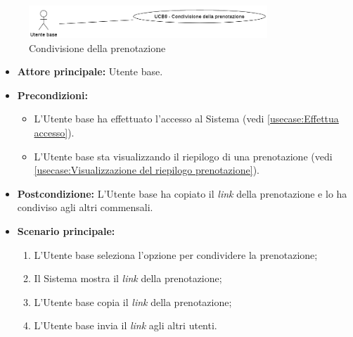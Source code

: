\label{usecase:Condivisione della prenotazione}

\begin{figure}[h]
	\centering
	\includegraphics[width=0.8\textwidth]{./uml/UCB9.png} 
	\caption{Condivisione della prenotazione}
	\label{fig:UCB9}
  \end{figure}

\begin{itemize}
	\item \textbf{Attore principale:} Utente base.

	\item \textbf{Precondizioni:}
	\begin{itemize}
		\item L'Utente base ha effettuato l'accesso al Sistema (vedi \autoref{usecase:Effettua accesso}).
		\item L'Utente base sta visualizzando il riepilogo di una prenotazione (vedi \autoref{usecase:Visualizzazione del riepilogo prenotazione}).
	\end{itemize}

	\item \textbf{Postcondizione:}
	      L'Utente base ha copiato il \textit{link} della prenotazione e lo ha condiviso agli altri commensali.

	\item \textbf{Scenario principale:}
	      \begin{enumerate}
		      \item L'Utente base seleziona l'opzione per condividere la prenotazione;
		      \item Il Sistema mostra il \textit{link} della prenotazione;
		      \item L'Utente base copia il \textit{link} della prenotazione;
		      \item L'Utente base invia il \textit{link} agli altri utenti.
	      \end{enumerate}
\end{itemize}
